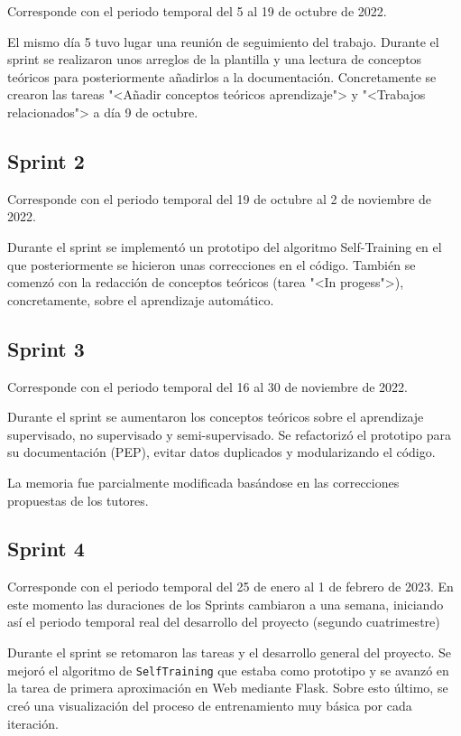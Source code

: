 Corresponde con el periodo temporal del 5 al 19 de octubre de 2022. 

El mismo día 5 tuvo lugar una reunión de seguimiento del trabajo. Durante el sprint se
realizaron unos arreglos de la plantilla y una lectura de conceptos teóricos
para posteriormente añadirlos a la documentación. Concretamente se crearon las
tareas "<Añadir conceptos teóricos aprendizaje"> y "<Trabajos relacionados"> a
día 9 de octubre.

\subsection{Sprint 2}

Corresponde con el periodo temporal del 19 de octubre al 2 de noviembre de 2022. 

Durante el sprint se implementó un prototipo del algoritmo Self-Training en el
que posteriormente se hicieron unas correcciones en el código. También se
comenzó con la redacción de conceptos teóricos (tarea "<In progess">), concretamente, sobre el
aprendizaje automático.


\subsection{Sprint 3}

Corresponde con el periodo temporal del 16 al 30 de noviembre de 2022.

Durante el sprint se aumentaron los conceptos teóricos sobre el aprendizaje
supervisado, no supervisado y semi-supervisado. Se refactorizó el prototipo para
su documentación (PEP), evitar datos duplicados y modularizando el código.

La memoria fue parcialmente modificada basándose en las correcciones propuestas
de los tutores.

\subsection{Sprint 4}

Corresponde con el periodo temporal del 25 de enero al 1 de febrero de 2023. En este
momento las duraciones de los Sprints cambiaron a una semana, iniciando así el
periodo temporal real del desarrollo del proyecto (segundo cuatrimestre)

Durante el sprint se retomaron las tareas y el desarrollo general del proyecto.
Se mejoró el algoritmo de \texttt{SelfTraining} que estaba como prototipo y se avanzó en
la tarea de primera aproximación en Web mediante Flask. Sobre esto último, se creó
una visualización del proceso de entrenamiento muy básica por cada iteración.


